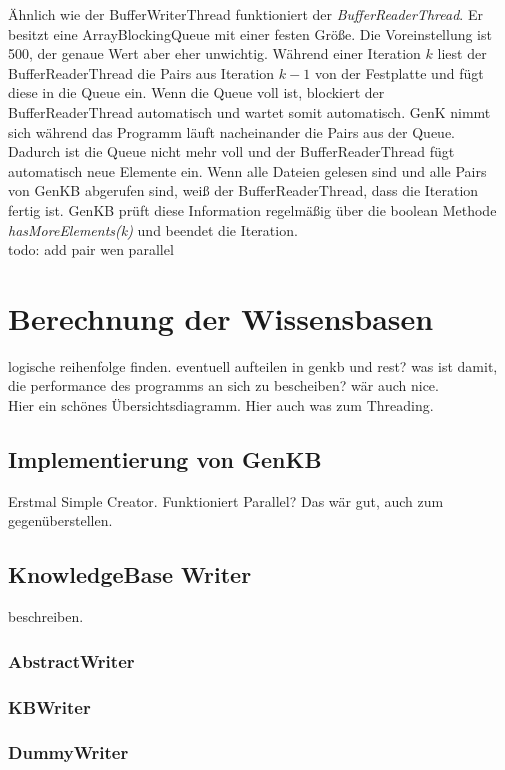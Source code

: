\documentclass[12pt,a4paper]{article}
\begin{document}
Ähnlich wie der BufferWriterThread funktioniert der \textit{BufferReaderThread}. Er besitzt eine ArrayBlockingQueue mit einer festen Größe. Die Voreinstellung ist 500, der genaue Wert aber eher unwichtig. Während einer Iteration $k$ liest der BufferReaderThread die Pairs aus Iteration $k-1$ von der Festplatte und fügt diese in die Queue ein. Wenn die Queue voll ist, blockiert der BufferReaderThread automatisch und wartet somit automatisch. GenK nimmt sich während das Programm läuft nacheinander die Pairs aus der Queue. Dadurch ist die Queue nicht mehr voll und der BufferReaderThread fügt automatisch neue Elemente ein. Wenn alle Dateien gelesen sind und alle Pairs von GenKB abgerufen sind, weiß der BufferReaderThread, dass die Iteration fertig ist. GenKB prüft diese Information regelmäßig über die boolean Methode \textit{hasMoreElements(k)} und beendet die Iteration.
\\todo: add pair wen parallel



\section{Berechnung der Wissensbasen}
logische reihenfolge finden. eventuell aufteilen in genkb und rest? was ist damit, die performance des programms an sich zu bescheiben? wär auch nice. \\



Hier ein schönes Übersichtsdiagramm. Hier auch was zum Threading.


\subsection{Implementierung von GenKB}
Erstmal Simple Creator. Funktioniert Parallel? Das wär gut, auch zum gegenüberstellen.
\subsection{KnowledgeBase Writer}
beschreiben. 
\subsubsection{AbstractWriter}

\subsubsection{KBWriter}

\subsubsection{DummyWriter}
\end{document}
